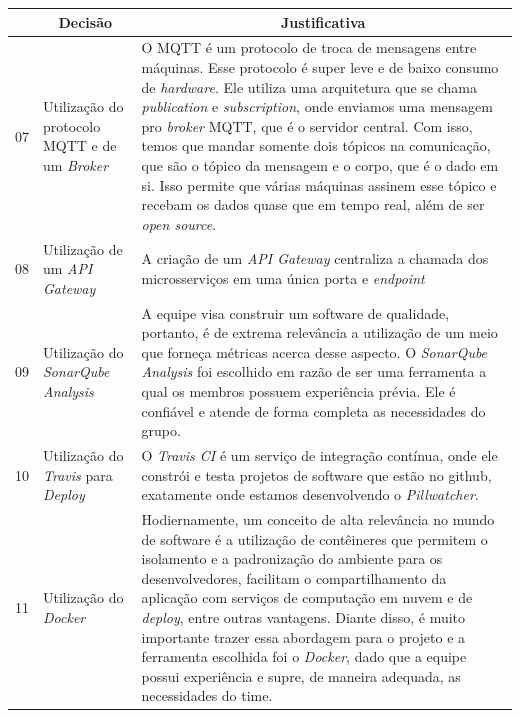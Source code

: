 \begin{apendicesenv}
\begin{table}[H]
    \centering
    \begin{adjustbox}{max width = \textwidth}
        \begin{tabular}{|c|p{5cm}|p{10cm}|}
            \hline
            \rowcolor[HTML]{A8DADC}
            \multicolumn{1}{|c}{\textbf{\#}} &
            \multicolumn{1}{|c}{\textbf{Decisão}} & \multicolumn{1}{|c|}{\textbf{Justificativa}} \\ 
            \hline
            07 & Utilização do protocolo MQTT e de um \textit{Broker} & O MQTT é um protocolo de troca de mensagens entre máquinas. Esse protocolo é super leve e de baixo consumo de \textit{hardware}. Ele utiliza uma arquitetura que se chama \textit{publication} e \textit{subscription}, onde enviamos uma mensagem pro \textit{broker} MQTT, que é o servidor central. Com isso, temos que mandar somente dois tópicos na comunicação, que são o tópico da mensagem e o corpo, que é o dado em si. Isso permite que várias máquinas assinem esse tópico e recebam os dados quase que em tempo real, além de ser \textit{open source}. \\ \hline
            08 & Utilização de um \textit{API Gateway} & A criação de um \emph{API Gateway} centraliza a chamada dos microsserviços em uma única porta e \emph{endpoint}\\ 
            \hline
             09 & Utilização do \textit{SonarQube Analysis} & A equipe visa construir um software de qualidade, portanto, é de extrema relevância a utilização de um meio que forneça métricas acerca desse aspecto. O \textit{SonarQube Analysis} foi escolhido em razão de ser uma ferramenta a qual os membros possuem experiência prévia. Ele é confiável e atende de forma completa as necessidades do grupo. \\ 
            \hline
            10 & Utilização do \textit{Travis} para \textit{Deploy} & O \textit{Travis CI} é um serviço de integração contínua, onde ele constrói e testa projetos de software que estão no github, exatamente onde estamos desenvolvendo o \textit{Pillwatcher}. \\ 
            \hline
            11 & Utilização do \textit{Docker} & Hodiernamente, um conceito de alta relevância no mundo de software é a utilização de contêineres que permitem o isolamento e a padronização do ambiente para os desenvolvedores, facilitam o compartilhamento da aplicação com serviços de computação em nuvem e de \textit{deploy}, entre outras vantagens. Diante disso, é muito importante trazer essa abordagem para o projeto e a ferramenta escolhida foi o \textit{Docker}, dado que a equipe possui experiência e supre, de maneira adequada, as necessidades do time.  \\ 

\end{tabular}
\end{adjustbox}
\end{table}
\end{apendicesenv}
